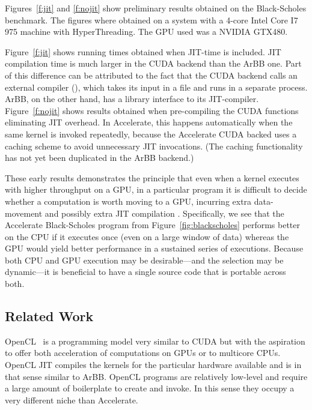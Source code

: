 Figures~\ref{f:jit} and \ref{f:nojit} show preliminary results obtained on 
the Black-Scholes benchmark. The figures where obtained on a system with a 4-core 
Intel Core I7 975 machine with HyperThreading. The GPU used was a NVIDIA GTX480.

Figure~\ref{f:jit} shows running times obtained when JIT-time is included. 
JIT compilation time is much larger 
in the CUDA backend than the ArBB one.  Part of this difference 
can be attributed to the fact that 
the CUDA backend calls an external compiler (), which takes its input in a file and runs in
a separate process.  ArBB, on the other hand, has a library interface to its  JIT-compiler. 
Figure~\ref{f:nojit} shows results obtained when pre-compiling the
CUDA functions eliminating JIT overhead.
In Accelerate, this happens automatically when the same kernel is
invoked repeatedly, because the Accelerate CUDA backed 
uses a caching scheme to avoid unnecessary JIT invocations.  (The
caching functionality has not yet been duplicated in the 
ArBB backend.)

These early results demonstrates the principle that even when a kernel
executes with higher throughput on a GPU, in a particular program it
is difficult to decide whether a computation is worth moving to a GPU,
incurring extra data-movement and possibly extra JIT compilation
.  Specifically, we see that the
Accelerate Black-Scholes program from Figure~\ref{fig:blackscholes}
performs better on the CPU if it executes once (even on a large window
of data) whereas the GPU would yield better performance in a sustained
series of executions.
%
Because both CPU and GPU execution may be desirable---and the
selection may be dynamic---it is beneficial to have a single source code
that is portable across both.  


\subsection{Related Work}


OpenCL~ is a programming model very similar to CUDA but with the aspiration 
to offer both acceleration of computations on GPUs or to multicore CPUs. 
OpenCL JIT compiles the kernels for the particular hardware available and is
in that sense similar to ArBB.  
OpenCL programs are relatively low-level and require a large amount of
boilerplate to create and invoke.  In this sense they occupy a very
different niche than Accelerate.

